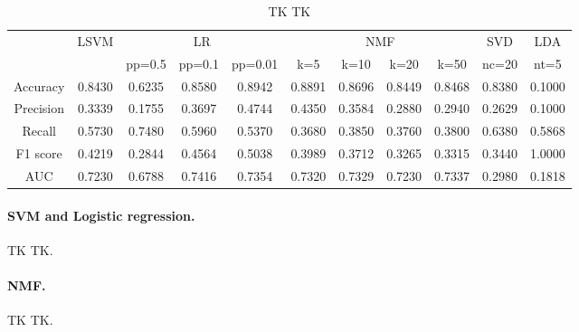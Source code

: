 \documentclass{article} %
\begin{document}
\begin{table}
\centering
{
\fontsize{8 }{14}\selectfont
\noindent\begin{tabular}{ c | c | c c c | c c c c | c | c }
	\hline
	    & \multirow{2}{*}{LSVM}
	    & \multicolumn{3}{c|}{LR}
	    & \multicolumn{4}{c|}{NMF}
	    & \multicolumn{1}{c|}{SVD}
	    & \multicolumn{1}{c}{LDA}\\
	\cline{3-11}
    & & pp=0.5 & pp=0.1 & pp=0.01 & k=5 & k=10 & k=20 & k=50 & nc=20 & nt=5 \\
	\hline
	\hline
	Accuracy  & 0.8430 & 0.6235 & 0.8580 & 0.8942 & 0.8891 & 0.8696 & 0.8449 & 0.8468 & 0.8380 & 0.1000 \\
	\hline
	Precision & 0.3339 & 0.1755 & 0.3697 & 0.4744 & 0.4350 & 0.3584 & 0.2880 & 0.2940 & 0.2629 & 0.1000 \\
	\hline
	Recall    & 0.5730 & 0.7480 & 0.5960 & 0.5370 & 0.3680 & 0.3850 & 0.3760 & 0.3800 & 0.6380 & 0.5868 \\
	\hline
	F1 score  & 0.4219 & 0.2844 & 0.4564 & 0.5038 & 0.3989 & 0.3712 & 0.3265 & 0.3315 & 0.3440 & 1.0000 \\
	\hline
	AUC       & 0.7230 & 0.6788 & 0.7416 & 0.7354 & 0.7320 & 0.7329 & 0.7230 & 0.7337 & 0.2980 & 0.1818 \\
	\hline
\end{tabular}
}
\caption{\small TK TK}
\label{tab:standardresults}
\end{table}

\paragraph{SVM and Logistic regression.} TK TK.

\paragraph{NMF.} TK TK.
\end{document}
